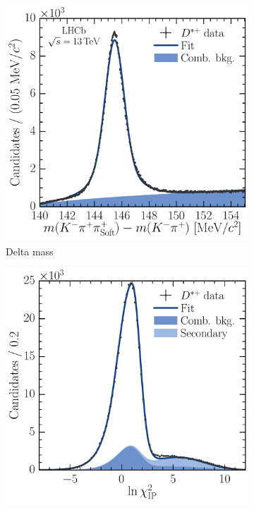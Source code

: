 \begin{figure}
\begin{subfigure}[b]{0.5\textwidth}
    \includegraphics[width=\textwidth]{figures/production/fitting/DstToD0pi_D0ToKpi_delta_mass_fit_pT_integrated_y_integrated}
    \caption{Delta mass}
    \label{fig:prod:fitting:DstToD0pi_D0ToKpi:delta_mass}
  \end{subfigure}
  \begin{subfigure}[b]{0.5\textwidth}
    \centering
    \includegraphics[width=\textwidth]{figures/production/fitting/DstToD0pi_D0ToKpi_ipchisq_fit_pT_integrated_y_integrated}

\end{subfigure}
\end{figure}
